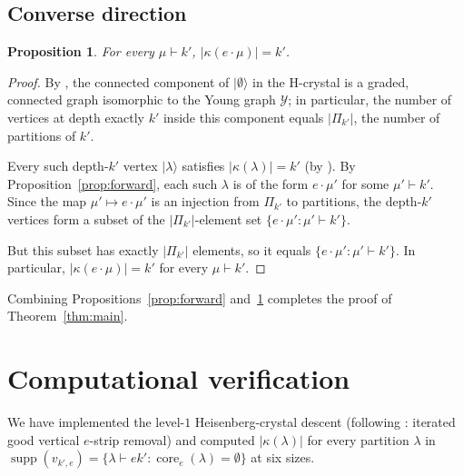 \documentclass[11pt]{article}
\newtheorem{proposition}[theorem]{Proposition}
\theoremstyle{definition}
\newcommand{\supp}{\operatorname{supp}}
\begin{document}
\subsection{Converse direction}

\begin{proposition}
\label{prop:converse}
For every $\mu \vdash k'$, $|\kappa(e \cdot \mu)| = k'$.
\end{proposition}

\begin{proof}
By \cite[Prop.~3.12(1),(2)]{Gerber}, the connected component of $|\emptyset
\rangle$ in the H-crystal is a graded, connected graph isomorphic to the
Young graph $\mathcal{Y}$; in particular, the number of vertices at
depth exactly $k'$ inside this component equals $|\Pi_{k'}|$, the number
of partitions of $k'$.

Every such depth-$k'$ vertex $|\lambda\rangle$ satisfies $|\kappa(\lambda)| =
k'$ (by \cite[Prop.~3.12(4)]{Gerber}). By Proposition~\ref{prop:forward},
each such $\lambda$ is of the form $e \cdot \mu'$ for some $\mu' \vdash k'$.
Since the map $\mu' \mapsto e \cdot \mu'$ is an injection from $\Pi_{k'}$ to
partitions, the depth-$k'$ vertices form a subset of the $|\Pi_{k'}|$-element
set $\{e \cdot \mu' : \mu' \vdash k'\}$.

But this subset has exactly $|\Pi_{k'}|$ elements, so it equals
$\{e \cdot \mu' : \mu' \vdash k'\}$. In particular, $|\kappa(e \cdot \mu)| = k'$
for every $\mu \vdash k'$.
\end{proof}

Combining Propositions~\ref{prop:forward} and~\ref{prop:converse} completes
the proof of Theorem~\ref{thm:main}.

\section{Computational verification}
\label{sec:verification}

We have implemented the level-$1$ Heisenberg-crystal descent (following
\cite[Thm.~5.11]{Gerber}: iterated good vertical $e$-strip removal) and
computed $|\kappa(\lambda)|$ for every partition $\lambda$ in $\supp(v_{k',e})
= \{\lambda \vdash ek' : \operatorname{core}_e(\lambda) = \emptyset\}$ at six
sizes.
\end{document}
